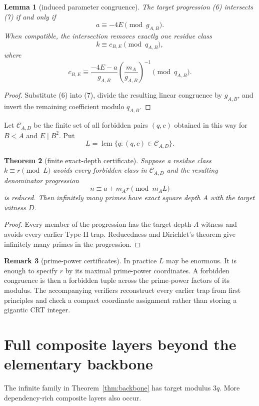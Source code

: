 \documentclass[11pt]{article}
\newtheorem{theorem}{Theorem}
\newtheorem{lemma}[theorem]{Lemma}
\theoremstyle{definition}
\newtheorem{remark}[theorem]{Remark}
\begin{document}
\begin{lemma}[induced parameter congruence]
The target progression (6) intersects (7) if and only if
\[
a\equiv-4E\pmod{g_{A,B}}.
\]
When compatible, the intersection removes exactly one residue class
\[
k\equiv c_{B,E}\pmod{q_{A,B}},
\]
where
\[
c_{B,E}\equiv
\frac{-4E-a}{g_{A,B}}
\left(\frac{m_A}{g_{A,B}}\right)^{-1}
\pmod{q_{A,B}}.
\]
\end{lemma}

\begin{proof}
Substitute (6) into (7), divide the resulting linear congruence by $g_{A,B}$, and invert the remaining coefficient modulo $q_{A,B}$.
\end{proof}

Let $\mathcal C_{A,D}$ be the finite set of all forbidden pairs $(q,c)$ obtained in this way for $B<A$ and $E\mid B^2$.  Put
\[
L=\operatorname{lcm}\{q:(q,c)\in\mathcal C_{A,D}\}.
\]

\begin{theorem}[finite exact-depth certificate]
Suppose a residue class $k\equiv r\pmod L$ avoids every forbidden class in $\mathcal C_{A,D}$ and the resulting denominator progression
\[
n\equiv a+m_Ar\pmod{m_AL}
\]
is reduced.  Then infinitely many primes have exact square depth $A$ with the target witness $D$.
\end{theorem}

\begin{proof}
Every member of the progression has the target depth-$A$ witness and avoids every earlier Type-II trap.  Reducedness and Dirichlet's theorem give infinitely many primes in the progression.
\end{proof}

\begin{remark}[prime-power certificates]
In practice $L$ may be enormous.  It is enough to specify $r$ by its maximal prime-power coordinates.  A forbidden congruence is then a forbidden tuple across the prime-power factors of its modulus.  The accompanying verifiers reconstruct every earlier trap from first principles and check a compact coordinate assignment rather than storing a gigantic CRT integer.
\end{remark}

\section{Full composite layers beyond the elementary backbone}
The infinite family in Theorem~\ref{thm:backbone} has target modulus $3q$.  More dependency-rich composite layers also occur.
\end{document}
